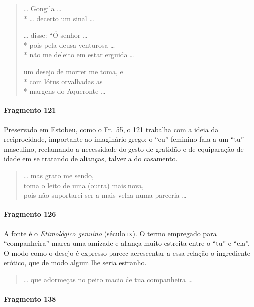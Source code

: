\begin{verse}
\ldots{} Gongila \ldots{}\\*
\ldots{} decerto um sinal \ldots{}

\ldots{} disse: “Ó senhor \ldots{}\\*
pois pela deusa venturosa \ldots{}\\*
não me deleito em estar erguida \ldots{}

um desejo de morrer me toma, e\\*
com lótus orvalhadas as\\*
margens do Aqueronte \ldots{}
\end{verse}


\paragraph{Fragmento 121}

{\small Preservado em Estobeu, como o Fr.~55, o 121 trabalha com a ideia da
reciprocidade, importante ao imaginário grego; o “eu” feminino fala a um “tu”
masculino, reclamando a necessidade do gesto de gratidão e de equiparação de
idade em se tratando de alianças, talvez a do casamento.}


\begin{verse}
\ldots{} mas grato me sendo,\\
toma o leito de uma (outra) mais nova, \\
pois não suportarei ser a mais velha numa \qb{}parceria \ldots{}
\end{verse}


\paragraph{Fragmento 126}

{\small A fonte é o \textit{Etimológico genuíno }(século \textsc{ix}). O termo empregado para
“companheira” marca uma amizade e aliança muito estreita entre o “tu”
e “ela”. O modo como o desejo é expresso parece acrescentar a essa relação o
ingrediente erótico, que de modo algum lhe seria estranho.}

\begin{verse}
\ldots{} que adormeças no peito macio de tua \qb{}companheira \ldots{} 
\end{verse}


\paragraph{Fragmento 138}

